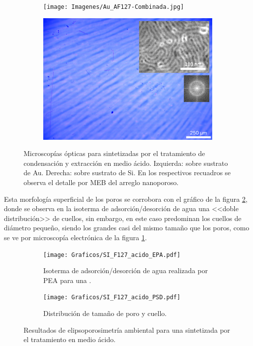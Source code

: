 {		\begin{figure}[!th]
	 	   	    \begin{subfigure}[t]{0.49\textwidth}
		       	\texttt{[image: Imagenes/Au\_AF127-Combinada.jpg]}
		   		\end{subfigure}
		   		\begin{subfigure}[t]{0.49\textwidth}
		   	    \includegraphics[width=\textwidth]{Imagenes/Si_AF127-Combinada.jpg}
		   		\end{subfigure}
				 \caption[Microscopía óptica \pdmF tratamiento en medio ácido.]{Microscopías ópticas para \pdmF\space sintetizadas por el tratamiento de condensación y extracción en medio ácido. Izquierda: sobre sustrato de Au. Derecha: sobre sustrato de Si. En los respectivos recuadros se observa el detalle por MEB del arreglo nanoporoso.}
				 \label{fig:Microscopia_F127_acido}	
			     \end{figure}	

		Esta morfología superficial de los poros se corrobora con el gráfico de la figura \ref{fig:F127_acido_EPA}, donde se observa en la isoterma de adsorción/desorción de agua una <<doble distribución>> de cuellos, sin embargo, en este caso predominan los cuellos de diámetro pequeño, siendo los grandes casi del mismo tamaño que los poros, como se ve por microscopía electrónica de la figura \ref{fig:Microscopia_F127_acido}.
		
		\begin{figure}[!ht]
		  	\begin{subfigure}[t]{0.495\textwidth}
		  	\texttt{[image: Graficos/SI\_F127\_acido\_EPA.pdf]}
			\caption{Isoterma de adsorción/desorción de agua realizada por PEA para una \pdmF.}
			\label{fig:F127_acido_EPA}
			\end{subfigure}
			\begin{subfigure}[t]{0.495\textwidth}
		  	\texttt{[image: Graficos/SI\_F127\_acido\_PSD.pdf]}
			\caption{Distribución de tamaño de poro y cuello.\\ }
			\label{fig:F127_acido_PSD}
			\end{subfigure}
			\caption[Elipsoporosimetría \pdmF\space tratamiento ácido.]{Resultados de elipsoporosimetría ambiental para una \pdmF\space sintetizada por el tratamiento en medio ácido.}
			\end{figure}

}
